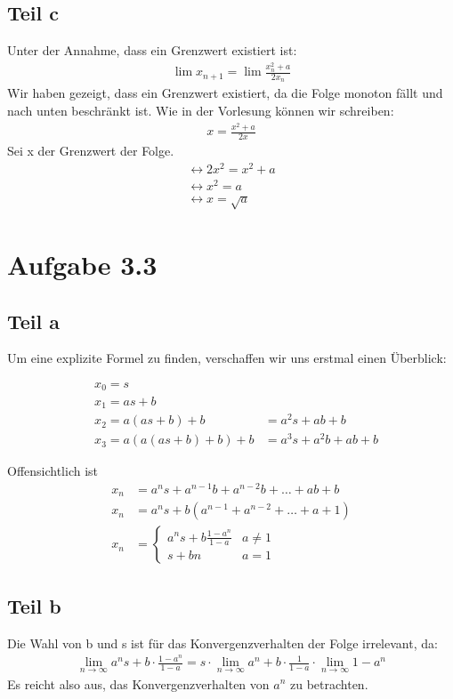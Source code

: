 \documentclass[a4paper,german,12pt,smallheadings]{scrartcl}
\begin{document}
\subsection*{Teil c}
Unter der Annahme, dass ein Grenzwert existiert ist:
\begin{align*}
\lim x_{n+1}=\lim \frac{x_n^2 + a}{2x_n}
\end{align*}
Wir haben gezeigt, dass ein Grenzwert existiert, da die Folge monoton fällt und nach unten beschränkt ist. Wie in der Vorlesung können wir schreiben:
\begin{align*}
x = \frac{x^2 + a}{2x}
\end{align*}
Sei x der Grenzwert der Folge.
\begin{align*}
\leftrightarrow 2x^2 = x^2 + a\\
\leftrightarrow x^2 = a\\
\leftrightarrow x = \sqrt{a}
\end{align*}

\section*{Aufgabe 3.3}
\subsection*{Teil a}

Um eine explizite Formel zu finden, verschaffen wir uns erstmal einen Überblick:

\begin{align*}
  &x_0 = s \\
  &x_1 = as + b \\
  &x_2 = a(as+b) + b &= a^2s+ab+b\\
  &x_3 = a(a(as+b)+b)+b &= a^3s + a^2b +ab + b
\end{align*}

Offensichtlich ist
\begin{align*}
  x_n &= a^ns + a^{n-1}b + a^{n-2}b + \dots + ab + b \\
  x_n &= a^ns + b(a^{n-1} + a^{n-2} + \dots + a + 1) \\
  x_n &= \left\{\begin{array}{ll} a^ns + b \frac{1-a^n}{1-a} & a \neq 1 \\
         s + bn & a = 1\end{array}\right.
\end{align*}

\subsection*{Teil b}
Die Wahl von b und s ist für das Konvergenzverhalten der Folge irrelevant, da:
\begin{align*}
\lim_{n \to \infty} a^ns + b\cdot\frac{1-a^n}{1-a} = s\cdot\lim_{n \to \infty} a^n + b\cdot \frac{1}{1-a} \cdot \lim_{n \to \infty} 1-a^n
\end{align*}
Es reicht also aus, das Konvergenzverhalten von $a^n$ zu betrachten.\\
\end{document}
